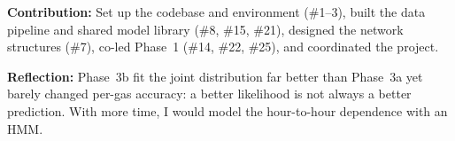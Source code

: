 \textbf{Contribution:} Set up the codebase and environment (\#1--3), built the
data pipeline and shared model library (\#8, \#15, \#21), designed the network
structures (\#7), co-led Phase~1 (\#14, \#22, \#25), and coordinated the project.

\noindent\textbf{Reflection:} Phase~3b fit the joint distribution far better than
Phase~3a yet barely changed per-gas accuracy: a better likelihood is not always
a better prediction. With more time, I would model the hour-to-hour dependence
with an HMM.